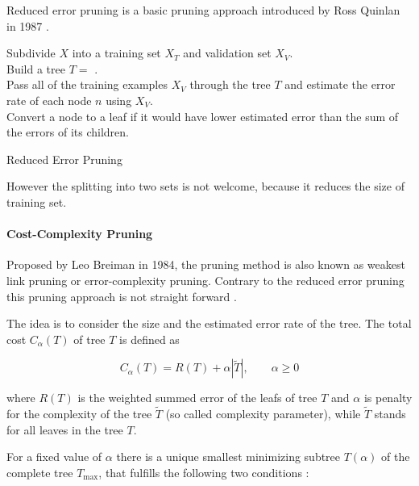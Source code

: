 Reduced error pruning is a basic pruning approach introduced by Ross Quinlan in 1987 \cite{quinlan1987simplifying}. 

\begin{algorithm}[!h]
\BlankLine
Subdivide $X$ into a training set $X_T$ and validation set $X_V$.\\
Build a tree $T = $ .\\
Pass all of the training examples $X_V$ through the tree $T$ and estimate the error rate of each node $n$ using $X_V$.\\
Convert a node to a leaf if it would have lower estimated error than the sum of the errors of its children.\\
\caption{Reduced Error Pruning}
\end{algorithm}

However the splitting into two sets is not welcome, because it reduces the size of training set. 


\paragraph{Cost-Complexity Pruning}

Proposed by Leo Breiman in 1984, the pruning method is also known as weakest link pruning or error-complexity pruning. Contrary to the reduced error pruning this pruning approach is not straight forward \cite[p. 64]{rokach2008data}. 

The idea is to consider the size and the estimated error rate of the tree. The total cost $C_\alpha (T)$ of tree $T$ is defined as

\begin{equation}
    C_\alpha (T) = R(T) + \alpha | \tilde T |, \qquad \alpha \geq 0 
\end{equation}

where $R(T)$ is the weighted summed error of the leafs of tree $T$ and $\alpha$ is penalty for the complexity of the tree $\tilde T$ (so called complexity parameter), while $\tilde T$ stands for all leaves in the tree $T$.

For a fixed value of $\alpha$ there is a unique smallest minimizing subtree $T(\alpha)$ of the complete tree $T_{\max}$, that fulfills the following two conditions \cite{mingers1989empirical}:

